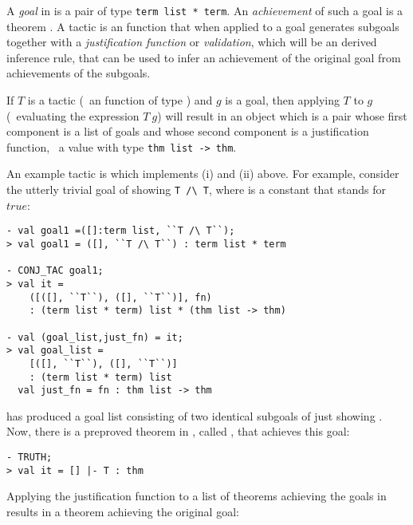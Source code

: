 A {\it goal\/} in \HOL{} is a pair  of
\ML{} type {\small\verb|term list * term|}. An {\it achievement\/} of
such a goal is a theorem .  A tactic
is an \ML{} function that when applied to a goal generates subgoals
together with a {\it justification function\/} or {\it validation\/},
which will be an \ML{} derived inference rule, that can be used to
infer an achievement of the original goal from achievements of the
subgoals.

If $T$ is a tactic (\ie\ an \ML{} function of type ) and $g$ is a goal, then applying $T$ to
$g$ (\ie\ evaluating the \ML{} expression $T\ g$) will result in an
object which is a pair whose first component is a list of goals and
whose second component is a justification function, \ie\ a value with
\ML{} type {\small\verb|thm list -> thm|}.

An example tactic is  which implements (i) and (ii)
above.  For example, consider the utterly trivial goal of showing
{\small\verb|T /\ T|}, where  is a constant that stands for
$true$:

\begin{session}\begin{verbatim}
- val goal1 =([]:term list, ``T /\ T``);
> val goal1 = ([], ``T /\ T``) : term list * term

- CONJ_TAC goal1;
> val it =
    ([([], ``T``), ([], ``T``)], fn)
    : (term list * term) list * (thm list -> thm)

- val (goal_list,just_fn) = it;
> val goal_list =
    [([], ``T``), ([], ``T``)]
    : (term list * term) list
  val just_fn = fn : thm list -> thm
\end{verbatim}\end{session}

\noindent {} has produced a goal  list consisting  of two identical
subgoals of just showing .  Now, there is a preproved
theorem in \HOL, called , that achieves this goal:

\begin{session}\begin{verbatim}
- TRUTH;
> val it = [] |- T : thm
\end{verbatim}\end{session}

\noindent Applying the justification function  to a list
of theorems achieving the goals in  results
in a theorem achieving the original goal:

